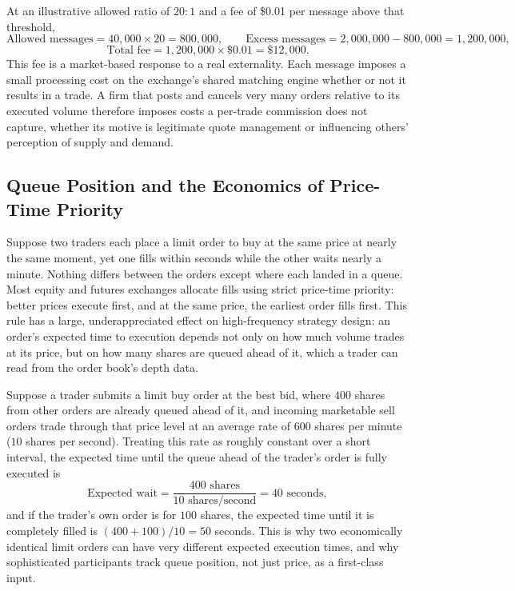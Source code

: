 \documentclass[../ai_in_finance]{subfiles}
\begin{document}
At an illustrative allowed ratio of $20{:}1$ and a fee of \$0.01 per message above that threshold,
\begin{equation*}
\text{Allowed messages} = 40{,}000 \times 20 = 800{,}000, \qquad \text{Excess messages} = 2{,}000{,}000 - 800{,}000 = 1{,}200{,}000,
\end{equation*}
\begin{equation*}
\text{Total fee} = 1{,}200{,}000 \times \$0.01 = \$12{,}000.
\end{equation*}
This fee is a market-based response to a real externality. Each message imposes a small processing cost on the exchange's shared matching engine whether or not it results in a trade. A firm that posts and cancels very many orders relative to its executed volume therefore imposes costs a per-trade commission does not capture, whether its motive is legitimate quote management or influencing others' perception of supply and demand.

\subsection{Queue Position and the Economics of Price-Time Priority}
\label{sec:queue-priority}

Suppose two traders each place a limit order to buy at the same price at nearly the same moment, yet one fills within seconds while the other waits nearly a minute. Nothing differs between the orders except where each landed in a queue. Most equity and futures exchanges allocate fills using strict price-time priority: better prices execute first, and at the same price, the earliest order fills first. This rule has a large, underappreciated effect on high-frequency strategy design: an order's expected time to execution depends not only on how much volume trades at its price, but on how many shares are queued ahead of it, which a trader can read from the order book's depth data.

Suppose a trader submits a limit buy order at the best bid, where $400$ shares from other orders are already queued ahead of it, and incoming marketable sell orders trade through that price level at an average rate of $600$ shares per minute ($10$ shares per second). Treating this rate as roughly constant over a short interval, the expected time until the queue ahead of the trader's order is fully executed is
\begin{equation*}
\text{Expected wait} = \frac{400 \text{ shares}}{10 \text{ shares/second}} = 40 \text{ seconds},
\end{equation*}
and if the trader's own order is for $100$ shares, the expected time until it is completely filled is $(400+100)/10=50$ seconds. This is why two economically identical limit orders can have very different expected execution times, and why sophisticated participants track queue position, not just price, as a first-class input.
\end{document}
